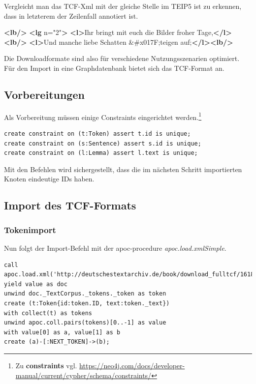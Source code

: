 \documentclass[12pt,ngerman,]{article}
\newenvironment{Shaded}{}{}
\newcommand{\KeywordTok}[1]{\textcolor[rgb]{0.00,0.44,0.13}{\textbf{#1}}}
\newcommand{\DecValTok}[1]{\textcolor[rgb]{0.25,0.63,0.44}{#1}}
\newcommand{\StringTok}[1]{\textcolor[rgb]{0.25,0.44,0.63}{#1}}
\newcommand{\OtherTok}[1]{\textcolor[rgb]{0.00,0.44,0.13}{#1}}
\newcommand{\NormalTok}[1]{#1}
\begin{document}
Vergleicht man das TCF-Xml mit der gleiche Stelle im TEIP5 ist zu
erkennen, dass in letzterem der Zeilenfall annotiert ist.

\begin{Shaded}
\begin{Highlighting}[]
\KeywordTok{<lb/>}
  \KeywordTok{<lg}\OtherTok{ n=}\StringTok{"2"}\KeywordTok{>}
      \KeywordTok{<l>}\NormalTok{Ihr bringt mit euch die Bilder froher Tage,}\KeywordTok{</l><lb/>}
      \KeywordTok{<l>}\NormalTok{Und manche liebe Schatten }\DecValTok{&#x017F;}\NormalTok{teigen auf;}\KeywordTok{</l><lb/>}
\end{Highlighting}
\end{Shaded}

Die Downloadformate sind also für verschiedene Nutzungsszenarien
optimiert. Für den Import in eine Graphdatenbank bietet sich das
TCF-Format an.

\subsection{Vorbereitungen}\label{vorbereitungen}

Als Vorbereitung müssen einige Constraints eingerichtet
werden.\footnote{Zu \textbf{constraints} vgl.
  \url{https://neo4j.com/docs/developer-manual/current/cypher/schema/constraints/}}

\begin{verbatim}
create constraint on (t:Token) assert t.id is unique;
create constraint on (s:Sentence) assert s.id is unique;
create constraint on (l:Lemma) assert l.text is unique;
\end{verbatim}

Mit den Befehlen wird sichergestellt, dass die im nächsten Schritt
importierten Knoten eindeutige IDs haben.

\subsection{Import des TCF-Formats}\label{import-des-tcf-formats}

\subsubsection{Tokenimport}\label{tokenimport}

Nun folgt der Import-Befehl mit der apoc-procedure
\emph{apoc.load.xmlSimple}.

\begin{verbatim}
call apoc.load.xml('http://deutschestextarchiv.de/book/download_fulltcf/16181') yield value as doc
unwind doc._TextCorpus._tokens._token as token
create (t:Token{id:token.ID, text:token._text})
with collect(t) as tokens
unwind apoc.coll.pairs(tokens)[0..-1] as value
with value[0] as a, value[1] as b
create (a)-[:NEXT_TOKEN]->(b);
\end{verbatim}
\end{document}
